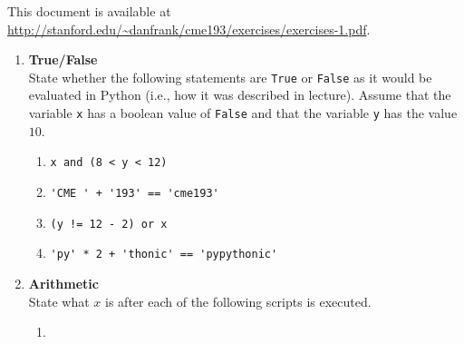 \documentclass{article}
\begin{document}
\pagestyle{fancy}

This document is available at \url{http://stanford.edu/~danfrank/cme193/exercises/exercises-1.pdf}.


\begin{enumerate}
\item \textbf{True/False} \\
State whether the following statements are \texttt{True} or \texttt{False} as it would be evaluated in Python (i.e., how it was described in lecture).  Assume that the variable \texttt{x} has a boolean value of \texttt{False} and that the variable \texttt{y} has the value $10$.

\begin{enumerate}
\item
\begin{lstlisting}
x and (8 < y < 12)
\end{lstlisting}
\end{enumerate}

\begin{enumerate}
\setcounter{enumii}{1}
\item 
\begin{lstlisting}
'CME ' + '193' == 'cme193'
\end{lstlisting}
\end{enumerate}

\begin{enumerate}
\setcounter{enumii}{2}
\item 
\begin{lstlisting}
(y != 12 - 2) or x
\end{lstlisting}
\end{enumerate}

\begin{enumerate}
\setcounter{enumii}{3}
\item 
\begin{lstlisting}
'py' * 2 + 'thonic' == 'pypythonic'
\end{lstlisting}
\end{enumerate}

\item \textbf{Arithmetic} \\
State what $x$ is after each of the following scripts is executed.

\begin{enumerate}
\item 
\end{enumerate}


\end{enumerate}
\end{document}
